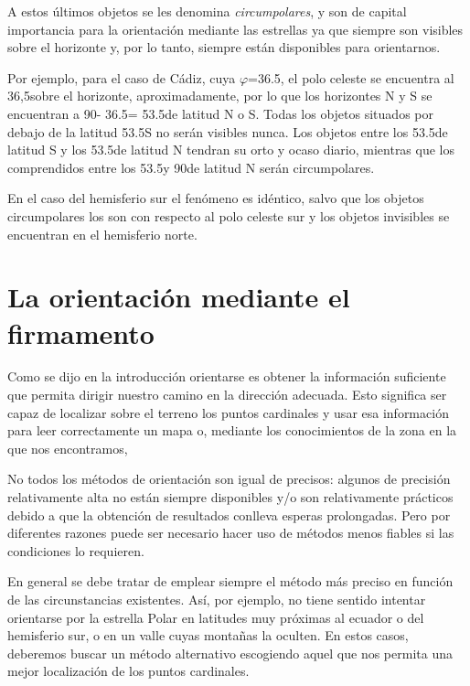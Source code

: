 \documentclass[12pt]{memoir}
\begin{document}
A estos últimos objetos se les denomina \textit{circumpolares}, y son de capital importancia para la orientación mediante las estrellas ya que siempre son visibles sobre el horizonte y, por lo tanto, siempre están disponibles para orientarnos.

Por ejemplo, para el caso de Cádiz, cuya $\varphi$=36.5\textdegree, el polo celeste se encuentra al 36,5\textdegree sobre el horizonte, aproximadamente, por lo que los horizontes N y S se encuentran a  90\textdegree - 36.5\textdegree = 53.5\textdegree de latitud N o S. Todas los objetos situados por debajo de la latitud 53.5\textdegree S no serán visibles nunca. Los objetos entre los 53.5\textdegree de latitud S y los 53.5\textdegree de latitud N tendran su orto y ocaso diario, mientras que los comprendidos entre los 53.5\textdegree y 90\textdegree de latitud N serán circumpolares.

En el caso del hemisferio sur el fenómeno es idéntico, salvo que los objetos circumpolares los son con respecto al polo celeste sur y los objetos invisibles se encuentran en el hemisferio norte. 

\section{La orientación mediante el firmamento}

Como se dijo en la introducción orientarse es obtener la información suficiente que permita  dirigir nuestro camino en la dirección adecuada. Esto significa ser capaz de localizar sobre el terreno los puntos cardinales y usar esa información para leer correctamente un mapa o, mediante los conocimientos de la zona en la que nos encontramos,

No todos los métodos de orientación son igual de precisos: algunos de precisión relativamente alta no están siempre disponibles y/o son relativamente prácticos debido a que la obtención de resultados conlleva esperas prolongadas. Pero por diferentes razones puede ser necesario hacer uso de métodos menos fiables si las condiciones lo requieren. 

En general se debe tratar de emplear siempre el método más preciso en función de las circunstancias existentes. Así, por ejemplo, no tiene sentido intentar orientarse por la estrella Polar en latitudes muy próximas al ecuador o del hemisferio sur, o en un valle cuyas montañas la oculten. En estos casos, deberemos buscar un método alternativo escogiendo aquel que nos permita una mejor localización de los puntos cardinales.
\end{document}

